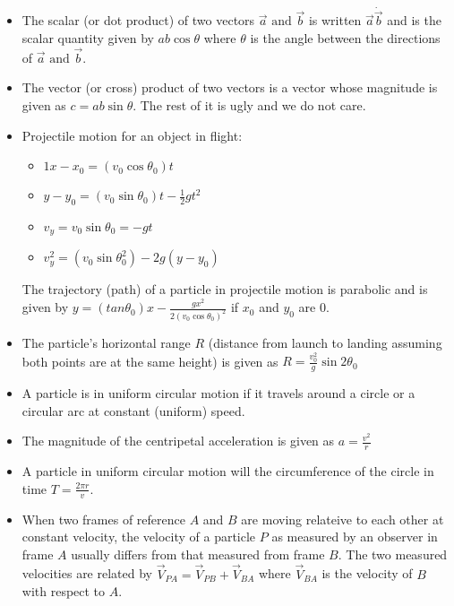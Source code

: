 \documentclass[10pt,letterpaper]{article}
\begin{document}
\begin{itemize}
\item The scalar (or dot product) of two vectors $\vec{a} \mbox{ and } \vec{b}$ is written $\vec{a} \dot \vec{b}$ and is the scalar quantity given by $ab\cos \theta$ where $\theta$ is the angle between the directions of $\vec{a} \mbox{ and } \vec{b}$. 
\item The vector (or cross) product of two vectors is a vector whose magnitude is given as $c=ab\sin\theta$. The rest of it is ugly and we do not care. 



\item Projectile motion for an object in flight: 
\begin{itemize}
\item $1x-x_0=(v_0\cos \theta _0)t$ \\ 
\item $ y-y_0=(v_0\sin \theta _0)t-\frac{1}{2}gt^2$ \\ 
\item $v_y=v_0\sin \theta _0=-gt$ \\ 
\item $v_y^2=(v_0\sin \theta _0 ^2)-2g(y-y_0)$ \\ 
\end{itemize}

The trajectory (path) of a particle in projectile motion is parabolic and is given by 
$y=(tan\theta _0)x-\frac{gx^2}{2(v_0\cos \theta _0)^2}$
if $x_0$ and $y_0$ are 0. 

\item The particle's horizontal range $R$ (distance from launch to landing assuming both points are at the same height) is given as $R=\frac{v_0^2}{g}\sin 2\theta _0$



\item A particle is in uniform circular motion if it travels around a circle or a circular arc at constant (uniform) speed. 

\item The magnitude of the centripetal acceleration is given as $a=\frac{v^2}{r}$ 
\item A particle in uniform circular motion will the circumference of the circle in time $T=\frac{2\pi r}{v}$. 


\item When two frames of reference $A$ and $B$ are moving relateive to each other at constant velocity, the velocity of a particle $P$ as measured by an observer in frame $A$ usually differs from that measured from frame $B$. The two measured velocities are related by $\vec{V}_{PA}=\vec{V}_{PB}+\vec{V}_{BA}$ where $\vec{V}_{BA}$ is the velocity of $B$ with respect to $A$. 


\end{itemize}
\end{document}

